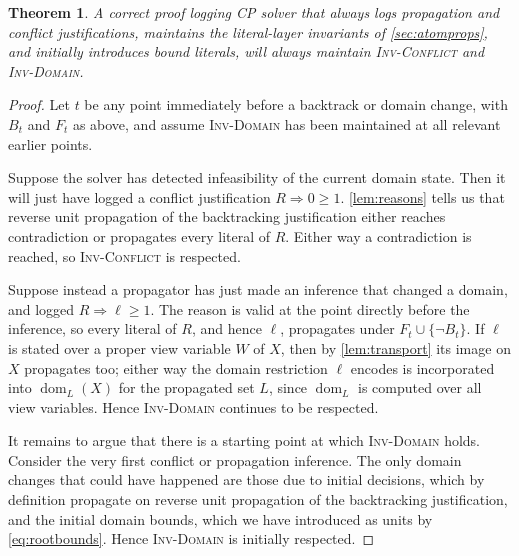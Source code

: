 \documentclass[11pt,a4paper]{article}
\theoremstyle{plain}
\newtheorem{theoremT}{Theorem}
\theoremstyle{definition}
\theoremstyle{remark}
\newcommand{\fname}[1]{\ensuremath{\operatorname{#1}}}
\newcommand{\dm}{\fname{dom}}
\newcommand{\inv}[1]{\textnormal{\textsc{Inv-#1}}}
\newcommand{\invConflict}{\inv{Conflict}}
\newcommand{\invDomain}{\inv{Domain}}
\begin{document}
\begin{theoremT}
\label{thm:maintain}
A correct proof logging CP solver that always logs propagation and conflict
justifications, maintains the literal-layer invariants of \cref{sec:atomprops},
and initially introduces bound literals, will always maintain \invConflict{} and
\invDomain{}.
\end{theoremT}

\begin{proof}
Let $t$ be any point immediately before a backtrack or domain change, with
$B_t$ and $F_t$ as above, and assume \invDomain{} has been maintained at all
relevant earlier points.

Suppose the solver has detected infeasibility of the current domain state.  Then
it will just have logged a conflict justification $R\Rightarrow 0\geq 1$.
\cref{lem:reasons} tells us that reverse unit propagation of the backtracking
justification either reaches contradiction or propagates every literal of $R$.
Either way a contradiction is reached, so \invConflict{} is respected.

Suppose instead a propagator has just made an inference that changed a domain,
and logged $R\Rightarrow\ell\geq 1$.  The reason is valid at the point directly
before the inference, so every literal of $R$, and hence $\ell$, propagates under
$F_t\cup\{\neg B_t\}$.  If $\ell$ is stated over a proper view variable $W$ of
$X$, then by \cref{lem:transport} its image on $X$ propagates too; either way the
domain restriction $\ell$ encodes is incorporated into $\dm_L(X)$ for the
propagated set $L$, since $\dm_L$ is computed over all view variables.  Hence
\invDomain{} continues to be respected.

It remains to argue that there is a starting point at which \invDomain{} holds.
Consider the very first conflict or propagation inference.  The only domain
changes that could have happened are those due to initial decisions, which by
definition propagate on reverse unit propagation of the backtracking
justification, and the initial domain bounds, which we have introduced as units
by \cref{eq:rootbounds}.  Hence \invDomain{} is initially respected.
\end{proof}
\end{document}
